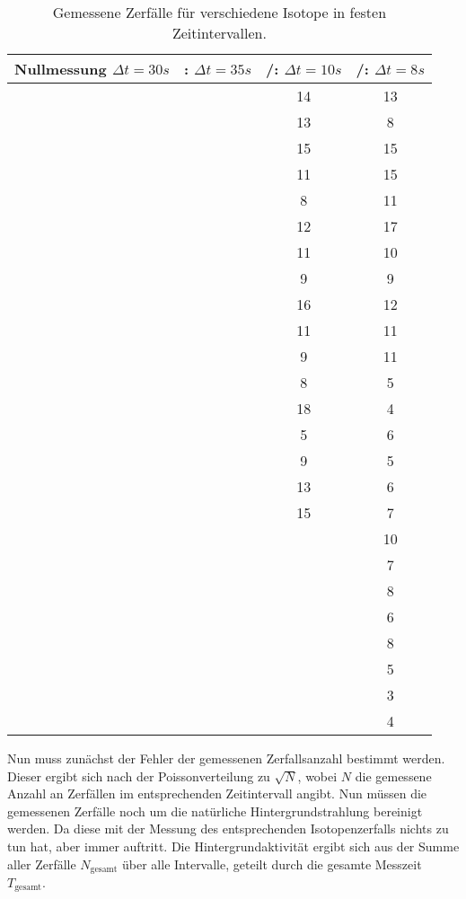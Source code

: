 \begin{table}[H]
  \centering
  \caption{Gemessene Zerfälle für verschiedene Isotope in festen Zeitintervallen.}
  \label{tab:Mess2}
  \begin{tabular}{S[table-format=2] S[table-format=3] S[table-format=3] S[table-format=3]}
      \toprule
      {Nullmessung $\Delta t=30s$ }&{: $\Delta t=35s$}&{/: $\Delta t=10s$}&{/: $\Delta t=8s$}\\
      \midrule
      &  & 14 & 13 \\
      &  & 13 & 8 \\
      &  & 15 & 15 \\
      &  & 11 & 15 \\
      &  & 8 & 11 \\
      &  & 12 & 17 \\
      &  & 11 & 10 \\
      &  & 9 & 9 \\
      &  & 16 & 12 \\
      &  & 11 & 11 \\
      &  & 9 & 11 \\
      &  & 8 & 5 \\
      &  & 18 & 4 \\
      &  & 5 & 6 \\
      &  & 9 & 5 \\
      &  & 13 & 6 \\
      &  & 15 & 7 \\
      &  &  & 10 \\
      &  &  & 7 \\
      &  &  & 8 \\
      &  &  & 6 \\
      &  &  & 8 \\
      &  &  & 5 \\
      &  &  & 3 \\
      &  &  & 4 \\       
      \bottomrule
  \end{tabular}
\end{table}
\noindent Nun muss zunächst der Fehler der gemessenen Zerfallsanzahl bestimmt werden. Dieser ergibt sich nach der 
Poissonverteilung zu $\sqrt{N}$, wobei $N$ die gemessene Anzahl an Zerfällen im entsprechenden Zeitintervall angibt.
Nun müssen die gemessenen Zerfälle noch um die natürliche Hintergrundstrahlung bereinigt werden. Da diese mit der Messung des entsprechenden Isotopenzerfalls
nichts zu tun hat, aber immer auftritt. Die Hintergrundaktivität ergibt sich aus der Summe aller Zerfälle $N_\text{gesamt}$ über alle Intervalle, geteilt durch die gesamte Messzeit $T_\text{gesamt}$.
